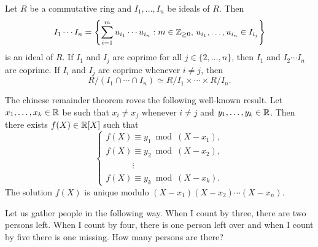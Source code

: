 Let $R$ be a commutative ring and $I_1,\dots,I_n$ be ideals of $R$. Then
\[
I_1\cdots I_n=\left\{
	\sum_{i=1}^mu_{i_1}\cdots u_{i_n}:m\in\mathbb{Z}_{\geq0},\,u_{i_1},\dots,u_{i_n}\in I_{i_j}
\right\}
\]
is an ideal of $R$. If $I_1$ and $I_j$ are coprime for all $j\in\{2,\dots,n\}$, 
then $I_1$ and $I_2\cdots I_n$ are coprime. If $I_i$ and $I_j$ are coprime
whenever $i\ne j$, then 
\[
R/(I_1\cap\cdots\cap I_n)\simeq R/I_1\times\cdots\times R/I_n.
\]

\begin{exercise}
	The chinese remainder theorem roves the following well-known result. 
	Let $x_1,\dots,x_k\in\mathbb{R}$ be such that $x_i\ne x_j$ whenever $i\ne j$ 
	and $y_1,\dots,y_k\in\mathbb{R}$. Then there exists $f(X)\in\mathbb{R}[X]$ such that
	\[
	\begin{cases}
		f(X)\equiv y_1\bmod (X-x_1),\\
		f(X)\equiv y_2\bmod (X-x_2),\\
		\phantom{f(X)}\vdots\\
		f(X)\equiv y_k\bmod (X-x_k).  	
	\end{cases}
 	\]
 	The solution $f(X)$ is unique modulo $(X-x_1)(X-x_2)\cdots (X-x_n)$. 
\end{exercise}

%


\begin{exercise}
\label{xca:gather_people}
	Let us gather people in the following way. When I 
	count by three, there are two persons left. 	When I count by four, 
	there is one person left over and when I count by five there is
	one missing. How many persons are there?
\end{exercise}

